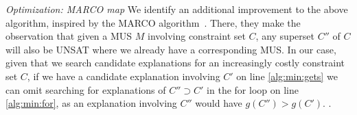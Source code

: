 \textit{Optimization: MARCO map} We identify an additional improvement to the above algorithm, inspired by the MARCO algorithm~\cite{liffiton2013enumerating}. There, they make the observation that given a MUS $M$ involving constraint set $C$, any superset $C''$ of $C$ will also be UNSAT where we already have a corresponding MUS. In our case, given that we search candidate explanations for an increasingly costly constraint set $C$, if we have a candidate explanation involving $C'$ on line \ref{alg:min:gets} we can omit searching for explanations of $C'' \supset C'$ in the for loop on line \ref{alg:min:for}, as an explanation involving $C''$ would have $g(C'') > g(C')$. .




